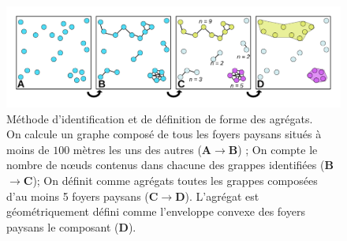 \begin{figure}[H]
	\centering
	\includegraphics[width=1\linewidth]{src/identification_agregats.pdf}
	\caption{Méthode d'identification et de définition de forme des agrégats.\\On calcule un graphe composé de tous les foyers paysans situés à moins de $100$ mètres les uns des autres (\textbf{A}$\rightarrow$\textbf{B}) ; On compte le nombre de nœuds contenus dans chacune des \og grappes\fg{} identifiées (\textbf{B}$\rightarrow$\textbf{C}); On définit comme agrégats toutes les grappes composées d'au moins 5 foyers paysans (\textbf{C}$\rightarrow$\textbf{D}). L'agrégat est géométriquement défini comme l'enveloppe convexe des foyers paysans le composant (\textbf{D}).}
\end{figure}

